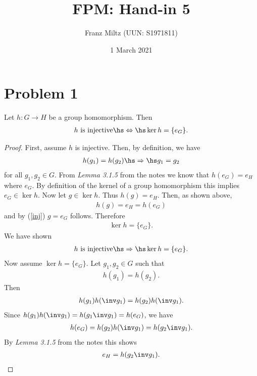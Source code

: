 \documentclass{article}
\begin{document}
\title{FPM: Hand-in 5}
\author{Franz Miltz (UUN: S1971811)}
\date{1 March 2021}
\maketitle
\mkthms

\section*{Problem 1}

\begin{claim*}
	Let $h:G\to H$ be a group homomorphism. Then
	\begin{align}
		\label{iff}
		h\text{ is injective}\hs\Leftrightarrow\hs \ker h = \{e_G\}.
	\end{align}
\end{claim*}
\begin{proof}
	First, assume $h$ is injective. Then, by definition, we have
	\begin{align}
		\label{inj}
		h(g_1)=h(g_2) \hs\Rightarrow\hs g_1 = g_2
	\end{align}
	for all $g_1,g_2\in G$. From \emph{Lemma 3.1.5} from the notes
	we know that $h(e_G) = e_H$ where $e_G$. By definition of the kernel of
	a group homomorphism this implies $e_G\in\ker h$. Now let
	$g\in\ker h$. Thus $h(g) = e_H$. Then, as shown above,
	\begin{align*}
		h(g) = e_H = h(e_G)
	\end{align*}
	and by (\ref{inj}) $g=e_G$ follows. Therefore
	\begin{align*}
		\ker h = \{e_G\}.
	\end{align*}
	We have shown
	\begin{align}
		\label{if}
		h\text{ is injective}\hs\Rightarrow\hs \ker h = \{e_G\}.
	\end{align}
	Now assume $\ker h = \{e_G\}$. Let $g_1,g_2\in G$ such that
	\begin{align*}
		h(g_1) = h(g_2).
	\end{align*}
	Then
	\begin{align*}
		h(g_1)h(\inv g_1) = h(g_2)h(\inv g_1).
	\end{align*}
	Since $h(g_1)h(\inv g_1) = h(g_1\inv g_1) = h(e_G)$, we have
	\begin{align*}
		h(e_G) = h(g_2)h(\inv g_1)= h(g_2\inv g_1).
	\end{align*}
	By \emph{Lemma 3.1.5} from the notes this shows
	\begin{align*}
		e_H = h(g_2\inv g_1).
	\end{align*}

\end{proof}
\end{document}
